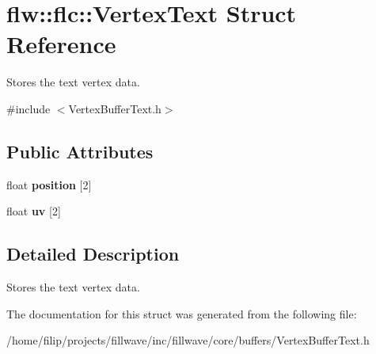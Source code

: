 \hypertarget{structflw_1_1flc_1_1VertexText}{}\section{flw\+:\+:flc\+:\+:Vertex\+Text Struct Reference}
\label{structflw_1_1flc_1_1VertexText}


Stores the text vertex data.  




{\ttfamily \#include $<$Vertex\+Buffer\+Text.\+h$>$}

\subsection*{Public Attributes}
\begin{DoxyCompactItemize}
\item 
\mbox{\label{structflw_1_1flc_1_1VertexText_a7026b7d1996f16408b724231846eccb2}} 
float {\bfseries position} \mbox{[}2\mbox{]}
\item 
\mbox{\label{structflw_1_1flc_1_1VertexText_a0b0f1d71f1c2301c2e0d3238062c1981}} 
float {\bfseries uv} \mbox{[}2\mbox{]}
\end{DoxyCompactItemize}


\subsection{Detailed Description}
Stores the text vertex data. 

The documentation for this struct was generated from the following file\+:\begin{DoxyCompactItemize}
\item 
/home/filip/projects/fillwave/inc/fillwave/core/buffers/Vertex\+Buffer\+Text.\+h\end{DoxyCompactItemize}
